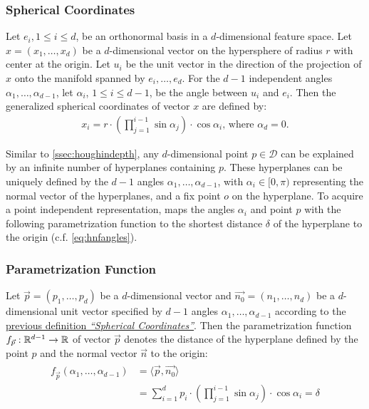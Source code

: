 \subsubsection*{Spherical Coordinates}\label{def:spherecord}
Let $e_i, 1 \leq i \leq d$, be an orthonormal basis in a $d$-dimensional feature space. Let $x=(x_1,\dotsc,x_d)$ be a $d$-dimensional vector on the hypersphere of radius $r$ with center at the origin. Let $u_i$ be the unit vector in the direction of the projection of $x$ onto the manifold spanned by $e_i,\dotsc,e_d$. For the $d-1$ independent angles $\alpha_1,\dotsc,\alpha_{d-1}$, let $\alpha_i$, $1 \leq i \leq d-1$, be the angle between $u_i$ and $e_i$. Then the generalized spherical coordinates of vector $x$ are defined by:
\begin{align}
    x_i = r \cdot (\prod_{j=1}^{i-1}\sin{\alpha_j}) \cdot \cos{\alpha_i}\text{, where } \alpha_d = 0.
\end{align}

Similar to \autoref{ssec:houghindepth}, any $d$-dimensional point $p \in \mathcal{D}$ can be explained by an infinite number of hyperplanes containing $p$. These hyperplanes can be uniquely defined by the $d-1$ angles $\alpha_1,\dotsc,\alpha_{d-1}$, with $\alpha_i \in [0,\pi)$ representing the normal vector of the hyperplanes, and a fix point $o$ on the hyperplane. To acquire a point independent representation, \citeauthor{CASHachtert2008robust} maps the angles $\alpha_i$ and point $p$ with the following parametrization function to the shortest distance $\delta$ of the hyperplane to the origin (c.f. \ref{eq:hnfangles}).

\subsubsection*{Parametrization Function}
Let $\vec{p} = (p_1,\dotsc,p_d)$ be a $d$-dimensional vector and $\vec{n_0} = (n_1,\dotsc,n_d)$ be a $d$-dimensional unit vector specified by $d-1$ angles $\alpha_1,\dotsc,\alpha_{d-1}$ according to the \hyperref[def:spherecord]{previous definition \textit{``Spherical Coordinates''}}. Then the parametrization function $f_{\vec{p}}:\mathbb{R}^{d-1} \rightarrow \mathbb{R}$ of vector $\vec{p}$ denotes the distance of the hyperplane defined by the point $p$ and the normal vector $\vec{n}$ to the origin:
\begin{align}
    \begin{split}
            f_{\vec{p}}(\alpha_1,\dotsc,\alpha_{d-1}) &= \langle \vec{p},\vec{n_0} \rangle\\
    &= \sum_{i=1}^d p_i \cdot (\prod_{j=1}^{i-1} \sin{\alpha_j}) \cdot \cos{\alpha_i}  = \delta
    \end{split}
\end{align}

